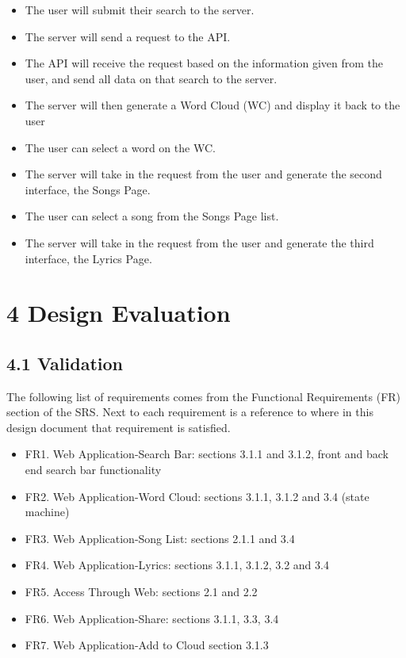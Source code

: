\documentclass[]{article}
\begin{document}
\begin{itemize}
\itemsep1pt\parskip0pt
\item
  The user will submit their search to the server.
\item
  The server will send a request to the API.
\item
  The API will receive the request based on the information given from
  the user, and send all data on that search to the server.
\item
  The server will then generate a Word Cloud (WC) and display it back to
  the user
\item
  The user can select a word on the WC.
\item
  The server will take in the request from the user and generate the
  second interface, the Songs Page.
\item
  The user can select a song from the Songs Page list.
\item
  The server will take in the request from the user and generate the
  third interface, the Lyrics Page.
\end{itemize}

\section{4 Design Evaluation}\label{design-evaluation}

\subsection{4.1 Validation}\label{validation}

The following list of requirements comes from the Functional
Requirements (FR) section of the SRS. Next to each requirement is a
reference to where in this design document that requirement is
satisfied.

\begin{itemize}
\itemsep1pt\parskip0pt
\item
  FR1. Web Application-Search Bar: sections 3.1.1 and 3.1.2, front and
  back end search bar functionality
\item
  FR2. Web Application-Word Cloud: sections 3.1.1, 3.1.2 and 3.4 (state
  machine)
\item
  FR3. Web Application-Song List: sections 2.1.1 and 3.4
\item
  FR4. Web Application-Lyrics: sections 3.1.1, 3.1.2, 3.2 and 3.4
\item
  FR5. Access Through Web: sections 2.1 and 2.2
\item
  FR6. Web Application-Share: sections 3.1.1, 3.3, 3.4
\item
  FR7. Web Application-Add to Cloud section 3.1.3
\end{itemize}
\end{document}
